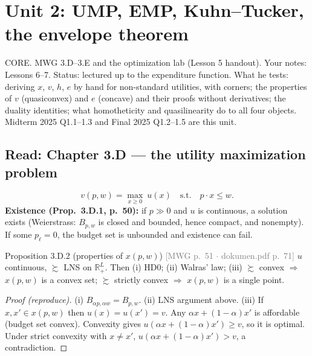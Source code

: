 \documentclass[11pt]{article}
\newcommand{\R}{\mathbb{R}}
\newcommand{\pref}{\succsim}
\newcommand{\mwg}[2]{\hfill{\small\textcolor{gray}{[MWG p.~#1 $\cdot$ dokumen.pdf p.~#2]}}}
\begin{document}
\clearpage
\section{Unit 2: UMP, EMP, Kuhn--Tucker, the envelope theorem}
\begin{unit}{CORE. MWG 3.D--3.E and the optimization lab (Lesson 5 handout). Your notes: Lessons 6--7. Status: lectured up to the expenditure function.}
What he tests: deriving $x$, $v$, $h$, $e$ by hand for non-standard utilities, with corners; the properties of $v$ (quasiconvex) and $e$ (concave) and their proofs without derivatives; the duality identities; what homotheticity and quasilinearity do to all four objects. Midterm 2025 Q1.1--1.3 and Final 2025 Q1.2--1.5 are this unit.
\end{unit}
\subsection{Read: Chapter 3.D --- the utility maximization problem}\label{sec:ump}
\[
v(p,w)=\max_{x\ge0}\ u(x)\quad\text{s.t.}\quad p\cdot x\le w .
\]
\textbf{Existence (Prop.~3.D.1, p.~50):} if $p\gg0$ and $u$ is continuous, a solution exists (Weierstrass: $B_{p,w}$ is closed and bounded, hence compact, and nonempty). If some $p_\ell=0$, the budget set is unbounded and existence can fail.

\begin{prop}{Proposition 3.D.2 (properties of $x(p,w)$) \mwg{51}{71}}
$u$ continuous, $\pref$ LNS on $\R^L_+$. Then
(i) HD0; (ii) Walras' law; (iii) $\pref$ convex $\Rightarrow$ $x(p,w)$ is a convex set; $\pref$ strictly convex $\Rightarrow$ $x(p,w)$ is a single point.
\end{prop}
\begin{proof}[Proof (reproduce)]
(i) $B_{\alpha p,\alpha w}=B_{p,w}$. (ii) LNS argument above. (iii) If $x,x'\in x(p,w)$ then $u(x)=u(x')=v$. Any $\alpha x+(1-\alpha)x'$ is affordable (budget set convex). Convexity gives $u(\alpha x+(1-\alpha)x')\ge v$, so it is optimal. Under strict convexity with $x\neq x'$, $u(\alpha x+(1-\alpha)x')>v$, a contradiction.
\end{proof}
\end{document}
